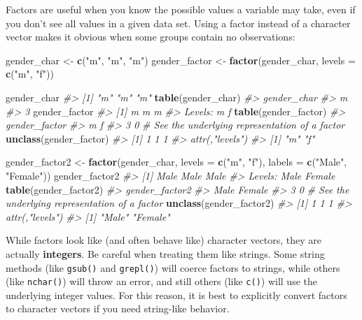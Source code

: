 \documentclass[]{book}
\newenvironment{Shaded}{\begin{snugshade}}{\end{snugshade}}
\newcommand{\KeywordTok}[1]{\textcolor[rgb]{0.13,0.29,0.53}{\textbf{#1}}}
\newcommand{\DataTypeTok}[1]{\textcolor[rgb]{0.13,0.29,0.53}{#1}}
\newcommand{\StringTok}[1]{\textcolor[rgb]{0.31,0.60,0.02}{#1}}
\newcommand{\CommentTok}[1]{\textcolor[rgb]{0.56,0.35,0.01}{\textit{#1}}}
\newcommand{\NormalTok}[1]{#1}
\theoremstyle{definition}
\theoremstyle{definition}
\theoremstyle{definition}
\theoremstyle{remark}
\begin{document}
Factors are useful when you know the possible values a variable may
take, even if you don't see all values in a given data set. Using a
factor instead of a character vector makes it obvious when some groups
contain no observations:

\begin{Shaded}
\begin{Highlighting}[]
\NormalTok{gender_char <-}\StringTok{ }\KeywordTok{c}\NormalTok{(}\StringTok{"m"}\NormalTok{, }\StringTok{"m"}\NormalTok{, }\StringTok{"m"}\NormalTok{)}
\NormalTok{gender_factor <-}\StringTok{ }\KeywordTok{factor}\NormalTok{(gender_char, }\DataTypeTok{levels =} \KeywordTok{c}\NormalTok{(}\StringTok{"m"}\NormalTok{, }\StringTok{"f"}\NormalTok{))}

\NormalTok{gender_char}
\CommentTok{#> [1] "m" "m" "m"}
\KeywordTok{table}\NormalTok{(gender_char)}
\CommentTok{#> gender_char}
\CommentTok{#> m }
\CommentTok{#> 3}
\NormalTok{gender_factor}
\CommentTok{#> [1] m m m}
\CommentTok{#> Levels: m f}
\KeywordTok{table}\NormalTok{(gender_factor)}
\CommentTok{#> gender_factor}
\CommentTok{#> m f }
\CommentTok{#> 3 0}
\CommentTok{# See the underlying representation of a factor}
\KeywordTok{unclass}\NormalTok{(gender_factor)}
\CommentTok{#> [1] 1 1 1}
\CommentTok{#> attr(,"levels")}
\CommentTok{#> [1] "m" "f"}

\NormalTok{gender_factor2 <-}\StringTok{ }\KeywordTok{factor}\NormalTok{(gender_char, }\DataTypeTok{levels =} \KeywordTok{c}\NormalTok{(}\StringTok{"m"}\NormalTok{, }\StringTok{"f"}\NormalTok{), }\DataTypeTok{labels =} \KeywordTok{c}\NormalTok{(}\StringTok{"Male"}\NormalTok{, }\StringTok{"Female"}\NormalTok{))}
\NormalTok{gender_factor2}
\CommentTok{#> [1] Male Male Male}
\CommentTok{#> Levels: Male Female}
\KeywordTok{table}\NormalTok{(gender_factor2)}
\CommentTok{#> gender_factor2}
\CommentTok{#>   Male Female }
\CommentTok{#>      3      0}
\CommentTok{# See the underlying representation of a factor}
\KeywordTok{unclass}\NormalTok{(gender_factor2)}
\CommentTok{#> [1] 1 1 1}
\CommentTok{#> attr(,"levels")}
\CommentTok{#> [1] "Male"   "Female"}
\end{Highlighting}
\end{Shaded}

While factors look like (and often behave like) character vectors, they
are actually \textbf{integers}. Be careful when treating them like
strings. Some string methods (like \texttt{gsub()} and \texttt{grepl()})
will coerce factors to strings, while others (like \texttt{nchar()})
will throw an error, and still others (like \texttt{c()}) will use the
underlying integer values. For this reason, it is best to explicitly
convert factors to character vectors if you need string-like behavior.
\end{document}
